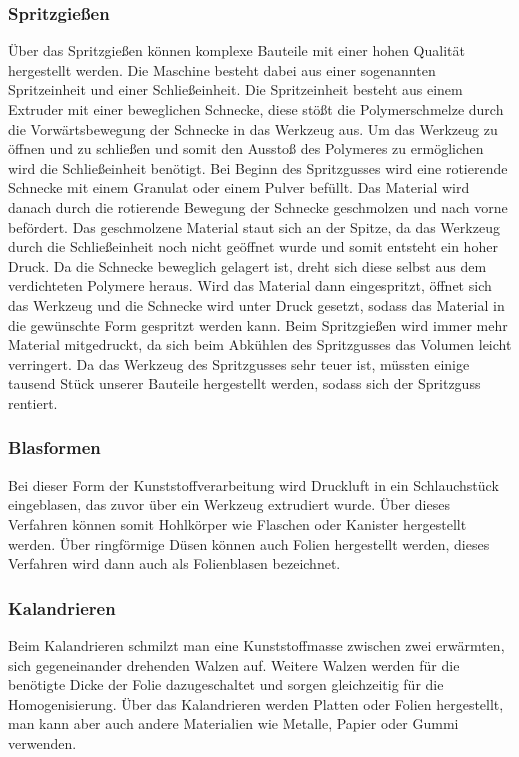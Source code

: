 \subsubsection{Spritzgießen}
Über das Spritzgießen können komplexe Bauteile mit einer hohen Qualität hergestellt werden. Die Maschine besteht dabei aus
einer sogenannten Spritzeinheit und einer Schließeinheit. Die Spritzeinheit besteht aus einem Extruder mit einer
beweglichen Schnecke, diese stößt die Polymerschmelze durch die Vorwärtsbewegung der Schnecke in das Werkzeug aus.
Um das Werkzeug zu öffnen und zu schließen und somit den Ausstoß des Polymeres zu ermöglichen wird die Schließeinheit
benötigt.
Bei Beginn des Spritzgusses wird eine rotierende Schnecke mit einem Granulat oder einem Pulver befüllt. Das Material
wird danach durch die rotierende Bewegung der Schnecke geschmolzen und nach vorne befördert. Das geschmolzene Material
staut sich an der Spitze, da das Werkzeug durch die Schließeinheit noch nicht geöffnet wurde und somit entsteht ein
hoher Druck. Da die Schnecke beweglich gelagert ist, dreht sich diese selbst aus dem verdichteten Polymere heraus.
Wird das Material dann eingespritzt, öffnet sich das Werkzeug und die Schnecke wird unter Druck gesetzt, sodass das
Material in die gewünschte Form gespritzt  werden kann.
Beim Spritzgießen wird immer mehr Material mitgedruckt, da sich beim Abkühlen des Spritzgusses das Volumen leicht
verringert.
Da das Werkzeug des Spritzgusses sehr teuer ist, müssten einige tausend Stück unserer Bauteile hergestellt werden,
sodass sich der Spritzguss rentiert.

\subsubsection{Blasformen}
Bei dieser Form der Kunststoffverarbeitung wird Druckluft in ein Schlauchstück eingeblasen, das zuvor über ein Werkzeug
extrudiert wurde. Über dieses Verfahren können somit Hohlkörper wie Flaschen oder Kanister hergestellt werden.
Über ringförmige Düsen können auch Folien hergestellt werden, dieses Verfahren wird dann auch als Folienblasen bezeichnet.

\subsubsection{Kalandrieren}
Beim Kalandrieren schmilzt man eine Kunststoffmasse zwischen zwei erwärmten, sich gegeneinander drehenden Walzen auf.
Weitere Walzen werden für die benötigte Dicke der Folie dazugeschaltet und sorgen gleichzeitig für die Homogenisierung.
Über das Kalandrieren werden Platten oder Folien hergestellt, man kann aber auch andere Materialien wie Metalle, Papier
oder Gummi verwenden.


